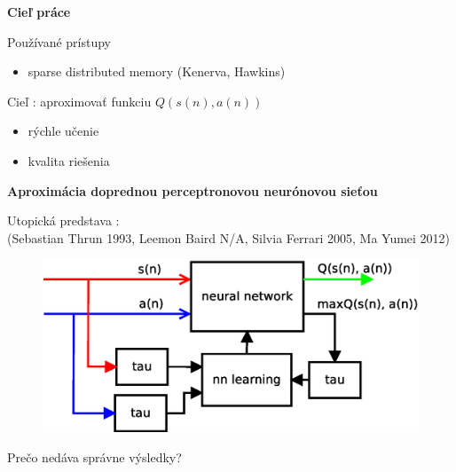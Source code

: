 \documentclass[xcolor=dvipsnames]{beamer}
\begin{document}
\begin{frame}{\bf Cieľ práce}
\begin{exampleblock}{Používané prístupy}
\begin{itemize}
  \vspace{-1mm}
  \item sparse distributed memory {\footnotesize (Kenerva, Hawkins)}
  \end{itemize}
\end{exampleblock}


\vspace{-3mm}

\begin{alertblock}{Cieľ : aproximovať funkciu $Q(s(n), a(n))$}
  \vspace{-3mm}
  \begin{itemize}

  \vspace{-1mm}
  \item rýchle učenie

  \vspace{-1mm}
  \item kvalita riešenia
  \end{itemize}
\end{alertblock}

\end{frame}


\begin{frame}{\bf Aproximácia doprednou perceptronovou neurónovou sieťou}

Utopická predstava : \\
{\footnotesize (Sebastian Thrun 1993, Leemon Baird N/A, Silvia Ferrari 2005, Ma Yumei 2012) }

\begin{figure}[!htb]
\includegraphics[scale=.5]{../diagrams/q_learning_nn.eps}
\end{figure}

Prečo nedáva správne výsledky?
\end{frame}
\end{document}
